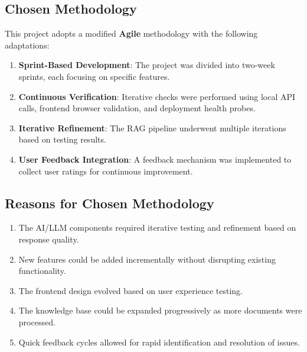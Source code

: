 \documentclass[12pt,a4paper]{book}
\numberwithin{table}{chapter}
\numberwithin{figure}{chapter}
\numberwithin{equation}{chapter}
\begin{document}
\subsection{Chosen Methodology}

This project adopts a modified \textbf{Agile} methodology with the following adaptations:

\begin{enumerate}
    \item \textbf{Sprint-Based Development}: The project was divided into two-week sprints, each focusing on specific features.

    \item \textbf{Continuous Verification}: Iterative checks were performed using local API calls, frontend browser validation, and deployment health probes.

    \item \textbf{Iterative Refinement}: The RAG pipeline underwent multiple iterations based on testing results.

    \item \textbf{User Feedback Integration}: A feedback mechanism was implemented to collect user ratings for continuous improvement.
\end{enumerate}

\subsection{Reasons for Chosen Methodology}

\begin{enumerate}
    \item The AI/LLM components required iterative testing and refinement based on response quality.

    \item New features could be added incrementally without disrupting existing functionality.

    \item The frontend design evolved based on user experience testing.

    \item The knowledge base could be expanded progressively as more documents were processed.

    \item Quick feedback cycles allowed for rapid identification and resolution of issues.
\end{enumerate}

\end{document}
